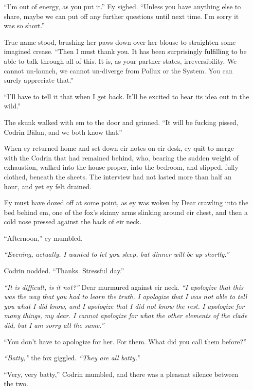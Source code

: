 ``I'm out of energy, as you put it.'' Ey sighed. ``Unless you have anything else to share, maybe we can put off any further questions until next time. I'm sorry it was so short.''

True name stood, brushing her paws down over her blouse to straighten some imagined crease. ``Then I must thank you. It has been surprisingly fulfilling to be able to talk through all of this. It is, as your partner states, irreversibility. We cannot un-launch, we cannot un-diverge from Pollux or the System. You can surely appreciate that.''

``I'll have to tell it that when I get back. It'll be excited to hear its idea out in the wild.''

The skunk walked with em to the door and grinned. ``It will be fucking pissed, Codrin Bălan, and we both know that.''

When ey returned home and set down eir notes on eir desk, ey quit to merge with the Codrin that had remained behind, who, bearing the sudden weight of exhaustion, walked into the house proper, into the bedroom, and slipped, fully-clothed, beneath the sheets. The interview had not lasted more than half an hour, and yet ey felt drained.

Ey must have dozed off at some point, as ey was woken by Dear crawling into the bed behind em, one of the fox's skinny arms slinking around eir chest, and then a cold nose pressed against the back of eir neck.

``Afternoon,'' ey mumbled.

\emph{``Evening, actually. I wanted to let you sleep, but dinner will be up shortly.''}

Codrin nodded. ``Thanks. Stressful day.''

\emph{``It is difficult, is it not?''} Dear murmured against eir neck. \emph{``I apologize that this was the way that you had to learn the truth. I apologize that I was not able to tell you what I did know, and I apologize that I did not know the rest. I apologize for many things, my dear. I cannot apologize for what the other elements of the clade did, but I am sorry all the same.''}

``You don't have to apologize for her. For them. What did you call them before?''

\emph{``Batty,''} the fox giggled. \emph{``They are all batty.''}

``Very, very batty,'' Codrin mumbled, and there was a pleasant silence between the two.

